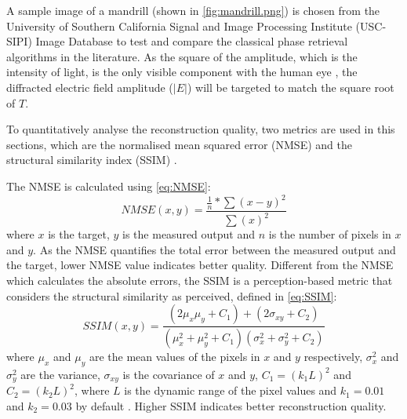 A sample image of a mandrill (shown in \cref{fig:mandrill.png}) is chosen from the University of Southern California Signal and Image Processing Institute (USC-SIPI) Image Database \cite{MANDRILL_REF} to test and compare the classical phase retrieval algorithms in the literature. As the square of the amplitude, which is the intensity of light, is the only visible component with the human eye \cite{Huang2024}, the diffracted electric field amplitude ($\vert E \vert$) will be targeted to match the square root of $T$.

To quantitatively analyse the reconstruction quality, two metrics are used in this sections, which are the normalised mean squared error (NMSE) \cite{MSE_REF} and the structural similarity index (SSIM) \cite{Wang2004_SSIM}.

The NMSE is calculated using \cref{eq:NMSE}:
\begin{equation}
  NMSE(x,y) = \frac{\frac{1}{n} * \sum (x - y)^2}{\sum (x)^2}
  \label{eq:NMSE}
\end{equation}
where $x$ is the target, $y$ is the measured output and $n$ is the number of pixels in $x$ and $y$. As the NMSE quantifies the total error between the measured output and the target, lower NMSE value indicates better quality. Different from the NMSE which calculates the absolute errors, the SSIM is a perception-based metric that considers the structural similarity as perceived, defined in \cref{eq:SSIM}:
\begin{equation}
  SSIM(x,y) = \frac{(2\mu_x\mu_y + C_1) + (2 \sigma _{xy} + C_2)}{(\mu_x^2 + \mu_y^2+C_1) (\sigma_x^2 + \sigma_y^2+C_2)}
  \label{eq:SSIM}
\end{equation}
where $\mu_x$ and $\mu_y$ are the mean values of the pixels in $x$ and $y$ respectively, $\sigma_x^2$ and $\sigma_y^2$ are the variance, $\sigma _{xy}$ is the covariance of $x$ and $y$, $C_1 = (k_1 L)^2$ and $C_2 = (k_2 L)^2$, where $L$ is the dynamic range of the pixel values and $k_1 = 0.01$ and $k_2 = 0.03$ by default \cite{Wang2004_SSIM}. Higher SSIM indicates better reconstruction quality.


